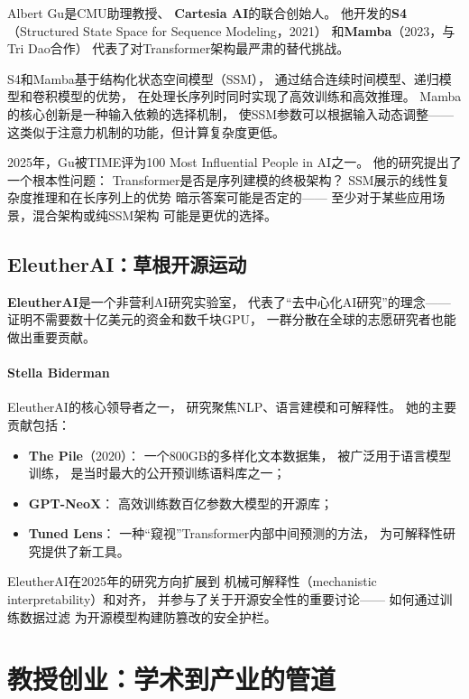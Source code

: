 Albert Gu是CMU助理教授、
\textbf{Cartesia AI}的联合创始人。
他开发的\textbf{S4}（Structured State Space for Sequence Modeling，2021）
和\textbf{Mamba}（2023，与Tri Dao合作）
代表了对Transformer架构最严肃的替代挑战。

S4和Mamba基于结构化状态空间模型（SSM），
通过结合连续时间模型、递归模型和卷积模型的优势，
在处理长序列时同时实现了高效训练和高效推理。
Mamba的核心创新是一种输入依赖的选择机制，
使SSM参数可以根据输入动态调整——
这类似于注意力机制的功能，但计算复杂度更低。

2025年，Gu被TIME评为100 Most Influential People in AI之一。
他的研究提出了一个根本性问题：
Transformer是否是序列建模的终极架构？
SSM展示的线性复杂度推理和在长序列上的优势
暗示答案可能是否定的——
至少对于某些应用场景，混合架构或纯SSM架构
可能是更优的选择。

\subsection{EleutherAI：草根开源运动}

\textbf{EleutherAI}是一个非营利AI研究实验室，
代表了``去中心化AI研究''的理念——
证明不需要数十亿美元的资金和数千块GPU，
一群分散在全球的志愿研究者也能做出重要贡献。

\paragraph{Stella Biderman}
EleutherAI的核心领导者之一，
研究聚焦NLP、语言建模和可解释性。
她的主要贡献包括：

\begin{itemize}[noitemsep]
  \item \textbf{The Pile}（2020）：
        一个800GB的多样化文本数据集，
        被广泛用于语言模型训练，
        是当时最大的公开预训练语料库之一；
  \item \textbf{GPT-NeoX}：
        高效训练数百亿参数大模型的开源库；
  \item \textbf{Tuned Lens}：
        一种``窥视''Transformer内部中间预测的方法，
        为可解释性研究提供了新工具。
\end{itemize}

EleutherAI在2025年的研究方向扩展到
机械可解释性（mechanistic interpretability）和对齐，
并参与了关于开源安全性的重要讨论——
如何通过训练数据过滤
为开源模型构建防篡改的安全护栏。


\section{教授创业：学术到产业的管道}
\label{sec:pipeline}

